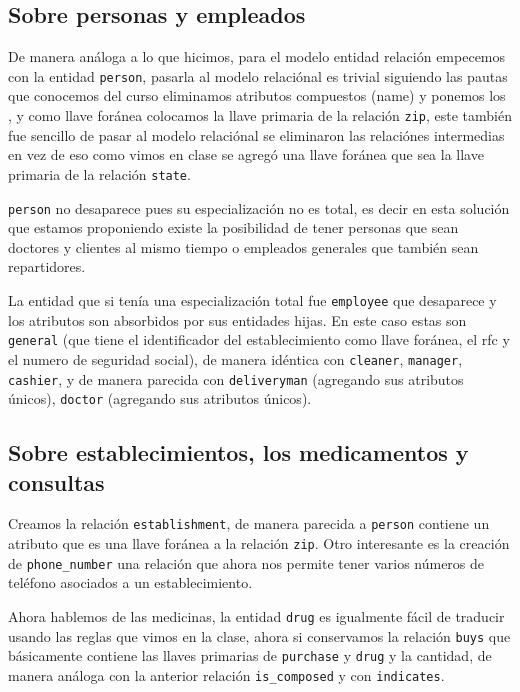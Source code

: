 \documentclass[12pt, fleqn]{report}                             %
\newcommand \Quote              {\qq}                           %
\theoremstyle{break}                                            %
\begin{document}
        \subsection{Sobre personas y empleados}

            De manera análoga a lo que hicimos, para el modelo entidad 
            relación empecemos con la entidad \texttt{person}, pasarla al modelo relaciónal es trivial siguiendo las pautas que conocemos del curso
            eliminamos atributos compuestos (name) y ponemos los \Quote{atributos hoja}, y como llave foránea colocamos la llave primaria de la 
            relación \texttt{zip}, este también fue sencillo de pasar al modelo relaciónal se eliminaron las relaciónes intermedias en vez de eso
            como vimos en clase se agregó una llave foránea que sea la llave primaria de la relación \texttt{state}.

            \texttt{person} no desaparece pues su especialización no es total, es decir en esta solución que estamos proponiendo existe 
            la posibilidad de tener personas que sean doctores y clientes al mismo tiempo o empleados generales que también sean repartidores.

            La entidad que si tenía una especialización total fue \texttt{employee} que desaparece y los atributos son absorbidos por
            sus entidades hijas. En este caso estas son \texttt{general} (que tiene el identificador del establecimiento como llave
            foránea, el rfc y el numero de seguridad social), de manera idéntica con \texttt{cleaner}, \texttt{manager}, \texttt{cashier},
            y de manera parecida con \texttt{deliveryman} (agregando sus atributos únicos), \texttt{doctor} (agregando sus atributos únicos).

        \subsection{Sobre establecimientos, los medicamentos y consultas}

            Creamos la relación \texttt{establishment}, de manera parecida a \texttt{person} contiene un atributo que es una llave foránea 
            a la relación \texttt{zip}.
            Otro  interesante es la creación de \texttt{phone\_number} una relación que ahora nos permite tener varios números de teléfono asociados
            a un establecimiento.

            Ahora hablemos de las medicinas, la entidad \texttt{drug} es igualmente fácil de traducir usando las reglas que vimos en la clase,
            ahora si conservamos la relación \texttt{buys} que básicamente contiene las llaves primarias de \texttt{purchase} y \texttt{drug}
            y la cantidad, de manera análoga con la anterior relación \texttt{is\_composed} y con \texttt{indicates}.
\end{document}

